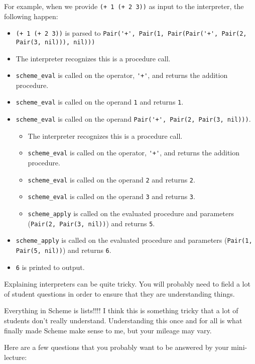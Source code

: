 For example, when we provide \lstinline{(+ 1 (+ 2 3))} as input to the interpreter, the following happen: 
\begin{itemize}
    \item \lstinline{(+ 1 (+ 2 3))} is parsed to \lstinline{Pair('+', Pair(1, Pair(Pair('+', Pair(2, Pair(3, nil))), nil)))}
    \item The interpreter recognizes this is a procedure call. 
    \item \lstinline{scheme_eval} is called on the operator, \lstinline{'+'}, and returns the addition procedure.
    \item \lstinline{scheme_eval} is called on the operand \lstinline{1} and returns \lstinline{1}. 
    \item \lstinline{scheme_eval} is called on the operand \lstinline{Pair('+', Pair(2, Pair(3, nil)))}. 
    \begin{itemize}
        \item The interpreter recognizes this is a procedure call. 
        \item \lstinline{scheme_eval} is called on the operator, \lstinline{'+'}, and returns the addition procedure.
        \item \lstinline{scheme_eval} is called on the operand \lstinline{2} and returns \lstinline{2}. 
        \item \lstinline{scheme_eval} is called on the operand \lstinline{3} and returns \lstinline{3}. 
        \item \lstinline{scheme_apply} is called on the evaluated procedure and parameters (\lstinline{Pair(2, Pair(3, nil))}) and returns \lstinline{5}. 
    \end{itemize}
    \item \lstinline{scheme_apply} is called on the evaluated procedure and parameters (\lstinline{Pair(1, Pair(5, nil))}) and returns \lstinline{6}. 
    \item \lstinline{6} is printed to output. 
\end{itemize}

\begin{meta}
Explaining interpreters can be quite tricky. You will probably need to field a lot of student questions
in order to ensure that they are understanding things. 

Everything in Scheme is lists!!!! I think this is something tricky that a lot of students don't really understand. 
Understanding this once and for all is what finally made Scheme make sense to me, but your mileage may
vary. 

Here are a few questions that you probably want to be answered by your mini-lecture: 

\end{meta}